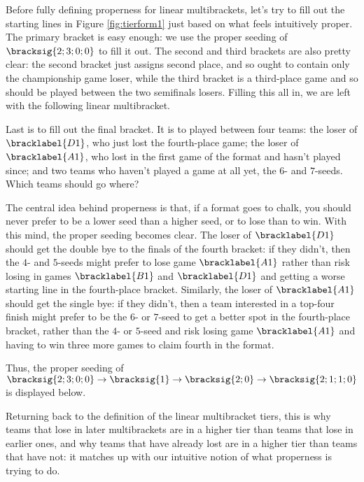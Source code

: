 {Before fully defining properness for linear multibrackets, let's try to fill out the starting lines in Figure \ref{fig:tierform1} just based on what feels intuitively proper. The primary bracket is easy enough: we use the proper seeding of $\bracksig{2;3;0;0}$ to fill it out. The second and third brackets are also pretty clear: the second bracket just assigns second place, and so ought to contain only the championship game loser, while the third bracket is a third-place game and so should be played between the two semifinals losers. Filling this all in, we are left with the following linear multibracket.


Last is to fill out the final bracket. It is to played between four teams: the loser of $\bracklabel{D1}$, who just lost the fourth-place game; the loser of $\bracklabel{A1}$, who lost in the first game of the format and hasn't played since; and two teams who haven't played a game at all yet, the $6$- and $7$-seeds. Which teams should go where?

The central idea behind properness is that, if a format goes to chalk, you should never prefer to be a lower seed than a higher seed, or to lose than to win. With this mind, the proper seeding becomes clear. The loser of $\bracklabel{D1}$ should get the double bye to the finals of the fourth bracket: if they didn't, then the $4$- and $5$-seeds might prefer to lose game $\bracklabel{A1}$ rather than risk losing in games $\bracklabel{B1}$ and $\bracklabel{D1}$ and getting a worse starting line in the fourth-place bracket. Similarly, the loser of $\bracklabel{A1}$ should get the single bye: if they didn't, then a team interested in a top-four finish might prefer to be the $6$- or $7$-seed to get a better spot in the fourth-place bracket, rather than the $4$- or $5$-seed and risk losing game $\bracklabel{A1}$ and having to win three more games to claim fourth in the format.

Thus, the proper seeding of $\bracksig{2;3;0;0} \to \bracksig{1} \to \bracksig{2;0} \to \bracksig{2;1;1;0}$ is displayed below.


Returning back to the definition of the linear multibracket tiers, this is why teams that lose in later multibrackets are in a higher tier than teams that lose in earlier ones, and why teams that have already lost are in a higher tier than teams that have not: it matches up with our intuitive notion of what properness is trying to do.

}
